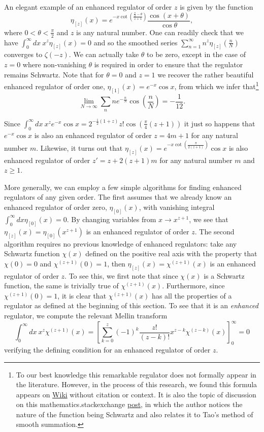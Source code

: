 \documentclass[11pt, letter]{article}
\def\be{\begin{equation}}
\def\ee{\end{equation}}
\begin{document}
An elegant example of an enhanced regulator of order $z$ is  given by the function 
\be \label{etaz}
\eta_{[z]}(x)=e^{-x\cot \left(\frac{\frac{\pi}{2}-\theta}{z+1}\right)}\frac{\cos(x+\theta)}{\cos\theta}, \ee
where $0< \theta<\frac{\pi}{2}$ and $z$ is any natural number. One can readily check that  we have $\int_0^\infty dx  \ x^z \eta_{[z]}(x)=0$ and so the smoothed series $\sum_{n=1}^\infty n^z \eta_{[z]}\left(\frac{n}{N}\right)$ converges to $\zeta(-z)$.   We can actually take $\theta$ to be zero, except in the case of $z=0$ where non-vanishing $\theta$ is required in order to ensure that the regulator remains Schwartz. Note that for  $\theta=0$ and $z=1$ we recover the rather beautiful enhanced regulator of order one, $\eta_{[1]}(x)=e^{-x} \cos x$, from which we infer that\footnote{To our best knowledge this remarkable regulator does not formally appear in the literature. However, in the process of this research, we found this formula appears on \href{https://en.wikiversity.org/wiki/MATLAB/Divergent_series_investigations}{Wiki} without citation or context. It is also the topic of discussion on this mathematics.stackexchange \href{https://math.stackexchange.com/questions/1327812/limit-approach-to-finding-1234-ldots}{post}, in which the author notices the nature of the function being Schwartz and also relates it to Tao's method of smooth summation.}
$$\lim_{N \to \infty} \sum_n n e^{-\frac{n}{N}} \cos \left(\frac{n}{N} \right)=-\frac{1}{12}.$$ 

 Since $\int_0^\infty dx \  x^z e^{-x} \cos x=2^{-\frac12(1+z)}z! \cos \left(\frac{\pi}{4} (z+1)\right)$ it just so happens that $e^{-x} \cos x$ is also an enhanced regulator of order $z=4m+1$ for any natural number $m$. Likewise, it turns out that $\eta_{[z]}(x)=e^{-x\cot \left(\frac{\pi}{2(z+1)}\right)}\cos x $  is also enhanced regulator of order $z'=z+2(z+1)m$ for any natural number $m$ and $z \geq 1$.


More generally, we can employ a few simple algorithms for finding enhanced regulators of any given order. The first assumes that we already know an enhanced regulator of order zero, $\eta_{[0]}(x)$, with vanishing integral $\int_0^\infty dx \eta_{[0]}(x)=0$. By changing variables from $x \to x^{z+1}$, we see that $\eta_{[z]}(x)=\eta_{[0]}(x^{z+1})$ is an enhanced regulator of order $z$.  
The second algorithm requires no previous knowledge of enhanced regulators: take any Schwartz function $\chi(x)$ defined on the positive real axis with the property that $\chi(0)=0$  and  $\chi^{(z+1)}(0)=1$, then $\eta_{[z]}(x)=\chi^{(z+1)}(x)$ is an enhanced regulator of order $z$. To see this, we first note that since $\chi(x)$  is a Schwartz function, the same is trivially true of $\chi^{(z+1)}(x)$. Furthermore, since $\chi^{(z+1)}(0)=1$, it is clear that $\chi^{(z+1)}(x)$ has all the properties of a regulator as defined at the beginning of this section. To see that it is an {\it enhanced} regulator, we compute the relevant Mellin transform
\be
\int_0^\infty  dx \ x^z\chi^{(z+1)}(x)=\left[ \sum_{k=0}^{z} (-1)^k \frac{z!}{(z-k)!} x^{z-k} \chi^{(z-k)}(x)\right]^\infty_0=0
\ee
verifying the defining condition for an enhanced regulator of order $z$. 
\end{document}
